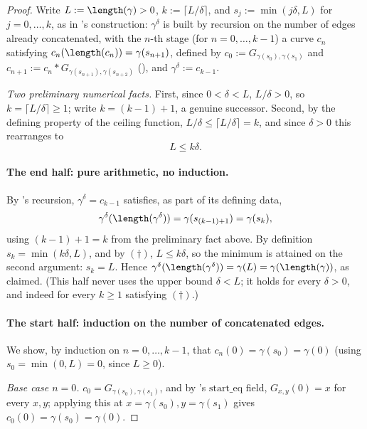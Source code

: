 \begin{proof}
  Write $L := \length(\gamma) > 0$, $k := \lceil L/\delta \rceil$, and $s_j := \min(j\delta, L)$
  for $j=0,\dots,k$, as in 's construction: $\gamma^\delta$ is built by
  recursion on the number of edges already concatenated, with the $n$-th stage (for $n=0,\dots,
  k-1$) a curve $c_n$ satisfying $c_n(\length(c_n)) = \gamma(s_{n+1})$, defined by $c_0 :=
  G_{\gamma(s_0),\gamma(s_1)}$ and $c_{n+1} := c_n * G_{\gamma(s_{n+1}),\gamma(s_{n+2})}$
  (), and $\gamma^\delta := c_{k-1}$.

  \emph{Two preliminary numerical facts.} First, since $0 < \delta < L$, $L/\delta > 0$, so
  $k = \lceil L/\delta\rceil \ge 1$; write $k = (k-1)+1$, a genuine successor. Second, by the
  defining property of the ceiling function, $L/\delta \le \lceil L/\delta\rceil = k$, and since
  $\delta>0$ this rearranges to
  \[
    L \le k\delta
    . \tag{$\dagger$}
  \]

  \paragraph{The end half: pure arithmetic, no induction.} By 's recursion,
  $\gamma^\delta = c_{k-1}$ satisfies, as part of its defining data,
  \[
    \gamma^\delta(\length(\gamma^\delta)) = \gamma(s_{(k-1)+1}) = \gamma(s_k)
    ,
  \]
  using $(k-1)+1=k$ from the preliminary fact above. By definition $s_k = \min(k\delta, L)$, and by
  $(\dagger)$, $L \le k\delta$, so the minimum is attained on the second argument:
  $s_k = L$. Hence $\gamma^\delta(\length(\gamma^\delta)) = \gamma(L) = \gamma(\length(\gamma))$,
  as claimed. (This half never uses the upper bound $\delta<L$; it holds for every $\delta>0$, and
  indeed for every $k\ge1$ satisfying $(\dagger)$.)

  \paragraph{The start half: induction on the number of concatenated edges.} We show, by induction
  on $n=0,\dots,k-1$, that $c_n(0) = \gamma(s_0) = \gamma(0)$ (using $s_0=\min(0,L)=0$, since
  $L\ge0$).

  \emph{Base case $n=0$.} $c_0 = G_{\gamma(s_0),\gamma(s_1)}$, and by 's
  $\mathrm{start\_eq}$ field, $G_{x,y}(0) = x$ for every $x,y$; applying this at
  $x=\gamma(s_0),y=\gamma(s_1)$ gives $c_0(0) = \gamma(s_0) = \gamma(0)$.


\end{proof}

